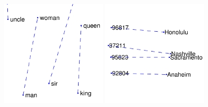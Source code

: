\begin{figure}[h]
\centering
\begin{minipage}{.3\textwidth}
  \centering
  \includegraphics[width=\linewidth]{images/glove_mw}
\end{minipage}
\begin{minipage}{.3\textwidth}
  \centering
  \includegraphics[width=\linewidth]{images/glove_cz}

\end{minipage}
\end{figure}
